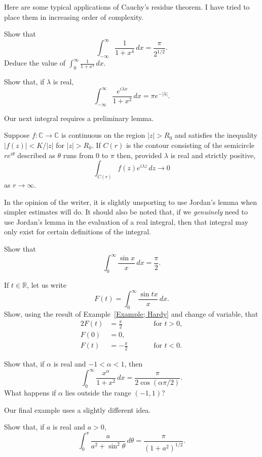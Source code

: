 Here are some typical applications of Cauchy's residue theorem.
I have tried to place them in increasing order of complexity.
\begin{example} Show that
\[\int_{-\infty}^{\infty}\frac{1}{1+x^{4}}\,dx
=\frac{\pi}{2^{1/2}}.\]
Deduce the value of $\int_{0}^{\infty}\frac{1}{1+x^{4}}\,dx$.
\end{example}
\begin{example} Show that, if $\lambda$ is real,
\[\int_{-\infty}^{\infty}\frac{e^{i\lambda x}}{1+x^{2}}\,dx
=\pi e^{-|\lambda|}.\]
\end{example}
Our next integral requires a preliminary lemma.
\begin{lemma} Suppose 
$f:{\mathbb C}\rightarrow{\mathbb C}$ is continuous
on the region $|z|>R_{0}$ and satisfies the inequality
$|f(z)|<K/|z|$ for $|z|>R_{0}$. If $C(r)$ is the contour
consisting of the semicircle $re^{i\theta}$ described
as $\theta$ runs from $0$ to $\pi$ then,
provided $\lambda$ is real and strictly positive,
\[\int_{C(r)}f(z)e^{i\lambda z}\,dz\rightarrow 0\]
as $r\rightarrow\infty$.
\end{lemma}
In the opinion of the writer, it is slightly
unsporting to use Jordan's lemma when simpler estimates
will do. It should also be noted that, if we \emph{genuinely}
need to use Jordan's lemma in the evaluation of a real 
integral, then that integral may only exist for certain definitions
of the integral.
\begin{example}\label{Example; Hardy} Show that
\[\int_{0}^{\infty}\frac{\sin x}{x}\,dx=\frac{\pi}{2}.\]
\end{example}
\begin{exercise} If $t\in{\mathbb R}$, let us write
\[F(t)=\int_{0}^{\infty}\frac{\sin tx}{x}\,dx.\]
Show, using the result of Example~\ref{Example; Hardy}
and change of variable, that
\begin{alignat*}{2}
F(t)&=\frac{\pi}{2}&&\qquad\text{for $t>0$},\\
F(0)&=0,\\
F(t)&=-\frac{\pi}{2}&&\qquad\text{for $t<0$}.
\end{alignat*}
\end{exercise}
\begin{example} Show that, if $\alpha$ is real and $-1<\alpha<1$,
then 
\[\int_{0}^{\infty}\frac{x^{\alpha}}{1+x^{2}}\,dx=
\frac{\pi}{2\cos(\alpha\pi/2)}.\]
What happens if $\alpha$ lies outside the range $(-1,1)$?
\end{example}
Our final example uses a slightly different idea.
\begin{example}
Show that, if $a$ is real and $a>0$,
\[\int_{0}^{\pi}\frac{a}{a^{2}+\sin^{2}\theta}\,d\theta
=\frac{\pi}{(1+a^{2})^{1/2}}.\]
\end{example}

